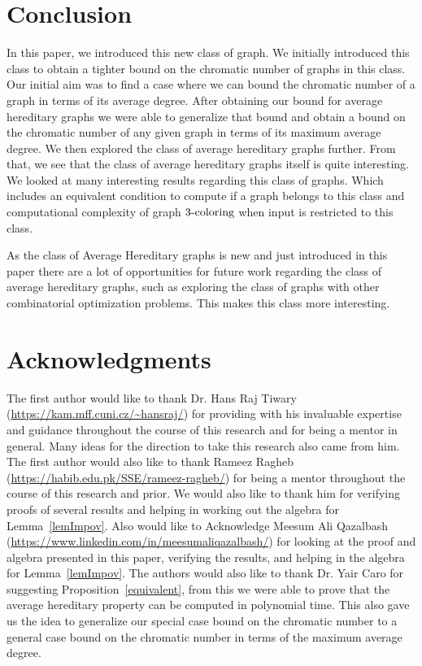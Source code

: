 \documentclass{article}
\newcommand{\Prob}[1]{\ensuremath{\text{\textsc{#1}}}}
\begin{document}
\section{Conclusion}
In this paper, we introduced this new class of graph. We initially introduced this class to obtain a tighter bound on the chromatic number of graphs in this class. Our initial aim was to find a case where we can bound the chromatic number of a graph in terms of its average degree. After obtaining our bound for average hereditary graphs we were able to generalize that bound and obtain a bound on the chromatic number of any given graph in terms of its maximum average degree.
We then explored the class of average hereditary graphs further. From that, we see that the class of average hereditary graphs itself is quite interesting. We looked at many interesting results regarding this class of graphs. Which includes an equivalent condition to compute if a graph belongs to this class and computational complexity of graph \Prob{3-coloring} when input is restricted to this class.

As the class of Average Hereditary graphs is new and just introduced in this paper there are a lot of opportunities for future work regarding the class of average hereditary graphs, such as exploring the class of graphs with other combinatorial optimization problems. This makes this class more interesting. 


\section*{Acknowledgments}
The first author would like to thank Dr. \sloppy Hans Raj Tiwary (\url{https://kam.mff.cuni.cz/~hansraj/}) for providing with his invaluable expertise and guidance throughout the course of this research and for being a mentor in general. Many ideas for the direction to take this research also came from him. The first author would also like to thank Rameez Ragheb (\url{https://habib.edu.pk/SSE/rameez-ragheb/}) for being a mentor throughout the course of this research and prior. We would also like to thank him for verifying proofs of several results and helping in working out the algebra for Lemma~\ref{lemImpov}. Also would like to Acknowledge Meesum Ali Qazalbash (\url{https://www.linkedin.com/in/meesumaliqazalbash/}) for looking at the proof and algebra presented in this paper, verifying the results, and helping in the algebra for Lemma~\ref{lemImpov}. The authors would also like to thank Dr. Yair Caro for suggesting Proposition~\ref*{equivalent}, from this we were able to prove that the average hereditary property can be computed in polynomial time. This also gave us the idea to generalize our special case bound on the chromatic number to a general case bound on the chromatic number in terms of the maximum average degree.
 

\end{document}
